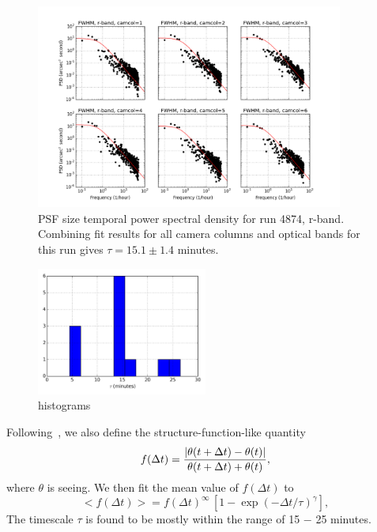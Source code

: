 \begin{figure}
\centering
\includegraphics[width=0.9\textwidth]{FIGURES/temporalPSD.png}
\caption{PSF size temporal power spectral density for run 4874, r-band. 
Combining fit results for all camera columns and optical bands for
this run
gives $\tau = 15.1 \pm 1.4$ minutes.
\label{fig:psd}}
\end{figure}

\begin{figure}
\centering
\includegraphics[width=0.5\textwidth]{FIGURES/hist.png}
\caption{histograms
\label{fig:hist}}
\end{figure}


Following~\cite{Racine1996}, we also define the structure-function-like quantity
\begin{equation}
       f(\Delta t) = {| \theta(t+\Delta t) - \theta(t)| \over  \theta(t+\Delta t) + \theta(t) },
\end{equation} 
where $\theta$ is seeing.
We then fit the mean value of $f(\Delta t)$ to 
\begin{equation}
    < f(\Delta t) > =  f(\Delta t) ^\infty \, \left[ 1 - \exp(-\Delta t/\tau)^\gamma \right],
\end{equation} 
The timescale $\tau$ is found to be mostly within the range of 15 $-$
25 minutes.



